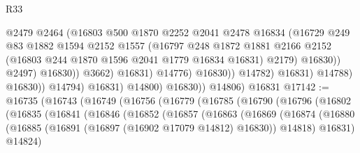 \begin{lexlean}{R33}
\begin{coremodule}
                                          @2479
                                          @2464
                                          (@16803
                                            @500
                                            @1870
                                            @2252
                                            @2041
                                            @2478
                                            @16834
                                            (@16729
                                              @249
                                              @83
                                              @1882
                                              @1594
                                              @2152
                                              @1557
                                              (@16797
                                                @248
                                                @1872
                                                @1881
                                                @2166
                                                @2152
                                                (@16803 @244 @1870 @1596 @2041 @1779 @16834 @16831)
                                                @2179)
                                              @16830))
                                          @2497)
                                        @16830))
                                    @3662)
                                  @16831)
                                @14776)
                              @16830))
                          @14782)
                        @16831)
                      @14788)
                    @16830))
                @14794)
              @16831)
            @14800)
          @16830))
      @14806)
    @16831
@17142 := @16735
    (@16743
      (@16749
        (@16756
          (@16779
            (@16785
              (@16790
                (@16796
                  (@16802
                    (@16835
                      (@16841
                        (@16846
                          (@16852
                            (@16857
                              (@16863
                                (@16869
                                  (@16874
                                    (@16880
                                      (@16885
                                        (@16891 (@16897 (@16902 @17079 @14812) @16830))
                                        @14818)
                                      @16831)
                                    @14824)

\end{coremodule}
\end{lexlean}
